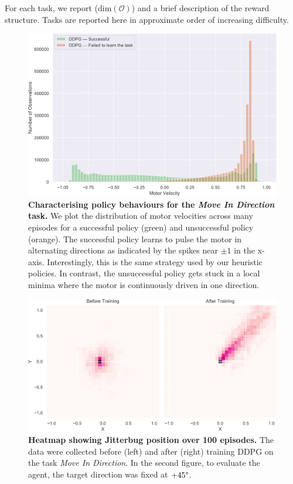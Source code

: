 \documentclass[letterpaper, 10 pt, conference]{ieeeconf}
\begin{document}
For each task, we report ($\text{dim}(\mathcal{O})$) and a brief description of the reward structure.
Tasks are reported here in approximate order of increasing difficulty.

\begin{figure}[t]
    \centering
    \includegraphics[width=\linewidth]{fig-motor-hist}
    \caption{
        \textbf{Characterising policy behaviours for the \emph{Move In Direction} task.}
        We plot the distribution of motor velocities across many episodes for a successful policy (green) and unsuccessful policy (orange).
        The successful policy learns to pulse the motor in alternating directions as indicated by the spikes near $\pm 1$ in the x-axis.
        Interestingly, this is the same strategy used by our heuristic policies.
        In contrast, the unsuccessful policy gets stuck in a local minima where the motor is continuously driven in one direction.
    }
    \label{fig:motor-hist}
\end{figure}

\begin{figure}[t]
    \centering
    \includegraphics[width=\linewidth]{fig-heatmap}
    \caption{
        \textbf{Heatmap showing Jitterbug position over 100 episodes.}
        The data were collected before (left) and after (right) training DDPG on the task \emph{Move In Direction}.
        In the second figure, to evaluate the agent, the target direction was fixed at $+45\degree$.
    }
    \label{fig:heatmap}
\end{figure}
\end{document}
